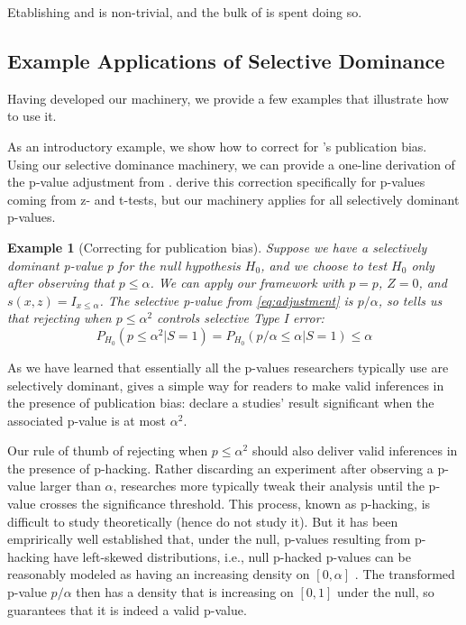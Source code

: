 \documentclass{article}
\newtheorem{example}{Example}
\begin{document}
Etablishing  and  is non-trivial, and the bulk of  is spent doing so. 

\subsection{Example Applications of Selective Dominance}

Having developed our machinery, we provide a few examples that illustrate how to use it.

As an introductory example, we show how to correct for 's publication bias. Using our selective dominance machinery, we can provide a one-line derivation of the p-value adjustment from \cite{Hung2020}. \cite{Hung2020} derive this correction specifically for p-values coming from z- and t-tests, but our machinery applies for all selectively dominant p-values. 

\begin{example}[Correcting for publication bias]
\label{exm:correction}
Suppose we have a selectively dominant p-value $p$ for the null hypothesis $H_0$, and we choose to test $H_0$ only after observing that $p \leq \alpha$. We can apply our framework with $p=p$, $Z=0$, and $s(x, z) = I_{x \leq \alpha}$. The selective p-value from \eqref{eq:adjustment} is $p/\alpha$, so  tells us that rejecting when $p \leq \alpha^2$ controls selective Type I error:
\begin{equation*}
    P_{H_0}(p \leq \alpha^2 | S= 1) =  P_{H_0}(p/\alpha \leq \alpha | S= 1) \leq \alpha  
\end{equation*}
\end{example}

As we have learned that essentially all the p-values researchers typically use are selectively dominant,  gives a simple way for readers to make valid inferences in the presence of publication bias: declare a studies' result significant when the associated p-value is at most $\alpha^2$.

Our rule of thumb of rejecting when $p \leq \alpha^2$ should also deliver valid inferences in the presence of p-hacking. Rather discarding an experiment after observing a p-value larger than $\alpha$, researches more typically tweak their analysis until the p-value crosses the significance threshold. This process, known as p-hacking, is difficult to study theoretically (hence \cite{Hung2020} do not study it). But it has been emprirically well established that, under the null, p-values resulting from p-hacking have left-skewed distributions, i.e., null p-hacked p-values can be reasonably modeled as having an increasing density on $[0,\alpha]$ \citep{Simonsohn}. The transformed p-value $p/\alpha$ then has a density that is increasing on $[0, 1]$ under the null, so  guarantees that it is indeed a valid p-value.
\end{document}
